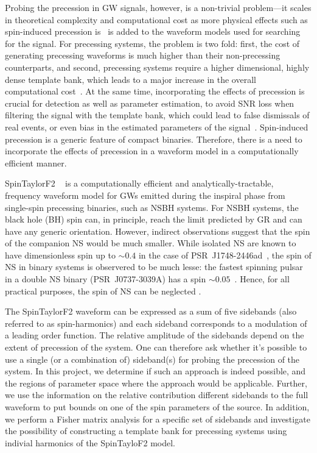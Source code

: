 Probing the precession in GW signals, however, is a non-trivial problem---it
scales in theoretical complexity and computational cost as more physical
effects such as spin-induced precession is~\cite{Apostolatos1994} is added to
the waveform models used for searching for the signal. For precessing systems,
the problem is two fold: first, the cost of generating precessing waveforms is
much higher than their non-precessing counterparts, and second, precessing
systems require a higher dimensional, highly dense template bank, which leads
to a major increase in the overall computational cost~\cite{PE_cost, Nat2017}.
At the same time, incorporating the effects of precession is crucial for
detection as well as parameter estimation, to avoid SNR loss when filtering
the signal with the template bank, which could lead to false dismissals of
real events, or even bias in the estimated parameters of the
signal~\cite{Bias_1}. Spin-induced precession is a generic feature of compact
binaries.  Therefore, there is a need to incorporate the effects of precession
in a waveform model in a computationally efficient manner.

SpinTaylorF2 ~\cite{Lundgren2014} is a computationally efficient
and analytically-tractable, frequency waveform model for GWs emitted during
the inspiral phase from single-spin precessing binaries, such as NSBH systems.
For NSBH systems, the black hole (BH) spin can, in principle, reach the limit
predicted by GR and can have any generic orientation. However, indirect
observations suggest that the spin of the companion NS would be much smaller.
While isolated NS are known to have dimensionless spin up to $\sim 0.4$ in the
case of PSR~J1748-2446ad~\cite{PSR2006}, the spin of NS in binary systems is
observered to be much lesse: the fastest spinning pulsar in a double NS
binary (PSR~J0737-3039A) has a spin $\sim 0.05$~\cite{BURGAY2003}. Hence, for
all practical purposes, the spin of NS can be neglected \cite{Lorimer:2008se}.

The SpinTaylorF2 waveform can be expressed as a sum of five sidebands (also
referred to as spin-harmonics) and each sideband corresponds to a modulation
of a leading order function. The relative amplitude of the sidebands depend on
the extent of precession of the system. One can therefore ask whether it's
possible to use a single (or a combination of) sideband(s) for probing the
precession of the system. In this project, we determine if such an approach is
indeed possible, and the regions of parameter space where the approach would
be applicable. Further, we use the information on the relative contribution
different sidebands to the full waveform to put bounds on one of the spin
parameters of the source. In addition, we perform a Fisher matrix analysis for
a specific set of sidebands and investigate the possibility of constructing a
template bank for precessing systems using indivial harmonics of the
SpinTayloF2 model.
